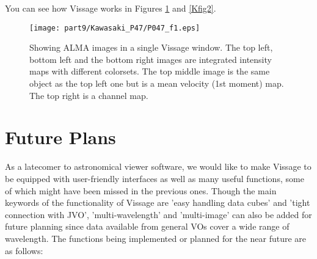 You can see how Vissage works in Figures \ref{Kfig1} and \ref{Kfig2}. 

\begin{figure}[tb]
  \centering
  \texttt{[image: part9/Kawasaki\_P47/P047\_f1.eps]}
  \caption{Showing ALMA images in a single Vissage window. The top left, bottom left and the bottom right images are integrated intensity maps with different colorsets. The top middle image is the same object as the top left one but is a mean velocity (1st moment) map. The top right is a channel map.}
  \label{Kfig1}
\end{figure}

\section{Future Plans}
As a latecomer to astronomical viewer software, we would like to make Vissage to be equipped with user-friendly interfaces as well as many useful functions, some of which might have been missed in the previous ones. Though the main keywords of the functionality of Vissage are 'easy handling data cubes' and 'tight connection with JVO', 'multi-wavelength' and 'multi-image' can also be added for future planning since data available from general VOs cover a wide range of wavelength. The functions being implemented or planned for the near future are as follows: 

